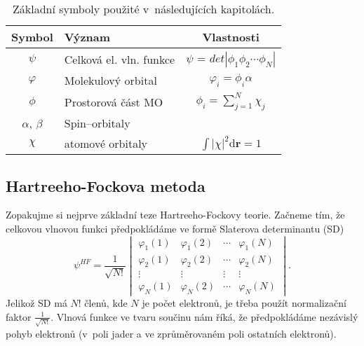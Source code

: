 \begin{table}[ht]
\centering
\caption{Základní symboly použité v~následujících kapitolách.}
\begin{tabular}{|c|l|c|}
\hline 
\rule[-1ex]{0pt}{2.5ex} Symbol & 	Význam	& Vlastnosti \\ 
\hline 
\rule[-1ex]{0pt}{2.5ex} $\psi$ & Celková el. vln. funkce  & $\psi$ = $det|\phi_1 \phi_2 \cdots \phi_N |$ \\ 
\hline 
\rule[-1ex]{0pt}{2.5ex} $\varphi$ & Molekulový orbital & $\varphi_i=\phi_i \alpha $\\ 
\hline 
\rule[-1ex]{0pt}{2.5ex} $\phi$ & Prostorová část MO & $\phi_i=\sum_{j=1}^N \chi_j $ \\ 
\hline 
\rule[-1ex]{0pt}{2.5ex} $\alpha$, $\beta$  & Spin--orbitaly & \\ 
\hline 
\rule[-0ex]{0pt}{2.5ex} $\chi$ & atomové orbitaly & $\int |\chi|^2 \mathrm{d}\textbf{r} = 1 $ \\
\hline
\end{tabular} 
\label{tab:vlnfunkce}
\end{table}

\subsection{Hartreeho-Fockova metoda}

Zopakujme si nejprve základní teze Hartreeho-Fockovy teorie. Začneme tím, že celkovou vlnovou funkci předpokládáme ve formě Slaterova determinantu (SD)
\begin{equation}
\psi^{HF}=\frac{1}{\sqrt{N!}}\begin{vmatrix}
\varphi_1(1) & \varphi_1(2) & \cdots & \varphi_1(N) \\
\varphi_2(1) & \varphi_2(2) & \cdots & \varphi_2(N) \\
\vdots & \vdots & \vdots & \vdots \\
\varphi_N(1) & \varphi_N (2) & \cdots & \varphi_N(N)
\end{vmatrix}.
\end{equation}
Jelikož SD má $N!$ členů, kde $N$ je počet elektronů, je třeba použít normalizační faktor $\frac{1}{\sqrt{N!}}$. Vlnová funkce ve tvaru součinu nám říká, že předpokládáme nezávislý pohyb elektronů (v~poli jader a ve zprůměrovaném poli ostatních elektronů).

